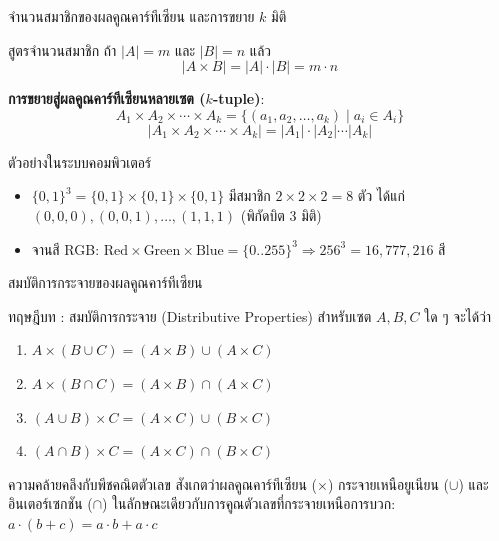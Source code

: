 \begin{frame}{จำนวนสมาชิกของผลคูณคาร์ทีเซียน และการขยาย $k$ มิติ}
  \begin{block}{สูตรจำนวนสมาชิก}
    ถ้า $|A| = m$ และ $|B| = n$ แล้ว
    \[ |A \times B| = |A| \cdot |B| = m \cdot n \]
  \end{block}
  \vspace{0.2em}
  \textbf{การขยายสู่ผลคูณคาร์ทีเซียนหลายเซต ($k$-tuple)}:
  \[ A_1 \times A_2 \times \cdots \times A_k = \{(a_1, a_2, \ldots, a_k) \mid a_i \in A_i\} \]
  \[ |A_1 \times A_2 \times \cdots \times A_k| = |A_1| \cdot |A_2| \cdots |A_k| \]
  \vspace{0.2em}
  \begin{exampleblock}{ตัวอย่างในระบบคอมพิวเตอร์}
    \begin{itemize}\small
      \item $\{0, 1\}^3 = \{0, 1\} \times \{0, 1\} \times \{0, 1\}$ มีสมาชิก $2 \times 2 \times 2 = 8$ ตัว
            ได้แก่ $(0,0,0), (0,0,1), \ldots, (1,1,1)$ (พิกัดบิต 3 มิติ)
      \item จานสี RGB: $\text{Red} \times \text{Green} \times \text{Blue} = \{0..255\}^3 \Rightarrow 256^3 = 16,777,216$ สี
    \end{itemize}
  \end{exampleblock}
\end{frame}

\begin{frame}{สมบัติการกระจายของผลคูณคาร์ทีเซียน}
  \begin{block}{ทฤษฎีบท : สมบัติการกระจาย (Distributive Properties)}
    สำหรับเซต $A, B, C$ ใด ๆ จะได้ว่า
    \begin{enumerate}
      \item $A \times (B \cup C) = (A \times B) \cup (A \times C)$
      \item $A \times (B \cap C) = (A \times B) \cap (A \times C)$
      \item $(A \cup B) \times C = (A \times C) \cup (B \times C)$
      \item $(A \cap B) \times C = (A \times C) \cap (B \times C)$
    \end{enumerate}
  \end{block}
  \vspace{0.2em}
  \begin{exampleblock}{ความคล้ายคลึงกับพีชคณิตตัวเลข}
    สังเกตว่าผลคูณคาร์ทีเซียน ($\times$) กระจายเหนือยูเนียน ($\cup$) และอินเตอร์เซกชัน ($\cap$)
    ในลักษณะเดียวกับการคูณตัวเลขที่กระจายเหนือการบวก: $a \cdot (b + c) = a \cdot b + a \cdot c$
  \end{exampleblock}
\end{frame}


